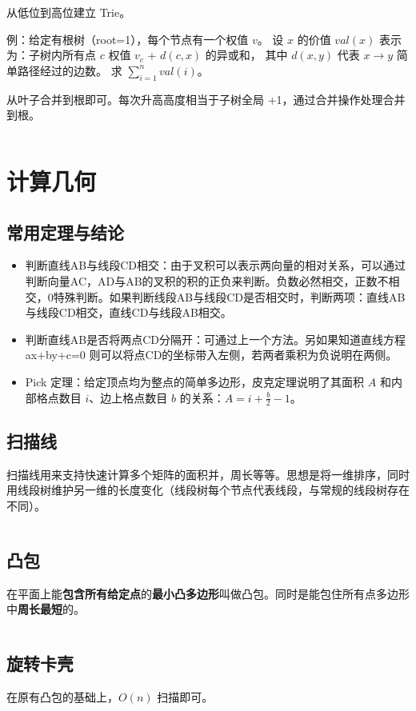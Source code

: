 \documentclass[a4paper,11pt]{article}
\begin{document}
从低位到高位建立 Trie。

例：给定有根树（root=1），每个节点有一个权值 $v$。
设 $x$ 的价值 $val(x)$ 表示为：子树内所有点 $c$ 权值 $v_c$ + $d(c,x)$ 的异或和，
其中 $d(x,y)$ 代表 $x\to y$ 简单路径经过的边数。
求 $\sum\limits_{i=1}^{n}{val(i)}$。

从叶子合并到根即可。每次升高高度相当于子树全局 +1，通过合并操作处理合并到根。
\inputminted[linenos]{c++}{structure/01triesum.cpp}




\newpage
\section{计算几何}
\subsection{常用定理与结论}
\begin{itemize}
\item
  判断直线AB与线段CD相交：由于叉积可以表示两向量的相对关系，可以通过判断向量AC，AD与AB的叉积的积的正负来判断。负数必然相交，正数不相交，0特殊判断。如果判断线段AB与线段CD是否相交时，判断两项：直线AB与线段CD相交，直线CD与线段AB相交。
\item
  判断直线AB是否将两点CD分隔开：可通过上一个方法。另如果知道直线方程 ax+by+c=0 则可以将点CD的坐标带入左侧，若两者乘积为负说明在两侧。
\item 
  Pick 定理：给定顶点均为整点的简单多边形，皮克定理说明了其面积 $A$ 和内部格点数目 $i$、边上格点数目 $b$ 的关系：$A=i+\frac{b}{2}-1$。
\end{itemize}
\subsection{扫描线}
扫描线用来支持快速计算多个矩阵的面积并，周长等等。思想是将一维排序，同时用线段树维护另一维的长度变化（线段树每个节点代表线段，与常规的线段树存在不同）。
\inputminted[linenos]{c++}{cg/ScanLine.cpp}
\subsection{凸包}
在平面上能\textbf{包含所有给定点}的\textbf{最小凸多边形}叫做凸包。同时是能包住所有点多边形中\textbf{周长最短}的。
\inputminted[linenos]{c++}{cg/andrew.cpp}
\subsection{旋转卡壳}
在原有凸包的基础上，\(O(n)\) 扫描即可。
\inputminted[linenos]{c++}{cg/diam.cpp}
\end{document}
